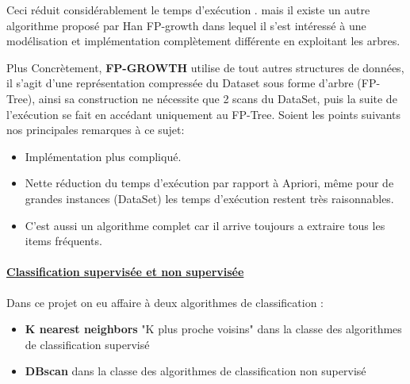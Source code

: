 \documentclass[12pt,a4paper,oneside]{book}
\begin{document}
Ceci réduit considérablement le temps d'exécution .
mais il existe un autre algorithme proposé par Han FP-growth dans lequel il s'est intéressé à une modélisation et implémentation complètement différente en exploitant les arbres.

Plus Concrètement, \textbf{FP-GROWTH} utilise de tout autres structures de données, il s'agit d'une représentation compressée du Dataset sous forme d'arbre (FP-Tree), ainsi sa construction ne nécessite que 2 scans du DataSet, puis la suite de l'exécution se fait en accédant uniquement au FP-Tree. Soient les points suivants nos principales remarques à ce sujet:
\begin{itemize}
	\item Implémentation plus compliqué.
	\item Nette réduction du temps d'exécution par rapport à Apriori, même pour de grandes instances (DataSet) les temps d'exécution restent très raisonnables.
	\item C'est aussi un algorithme complet car il arrive toujours a extraire tous les items fréquents. 
\end{itemize}


\paragraph{\underline{Classification supervisée et non supervisée}}

Dans ce projet on eu affaire à deux  algorithmes de classification :
\begin{itemize}
	\item \textbf{K nearest neighbors} "K plus proche voisins" dans la classe des algorithmes de classification supervisé
	\item \textbf{DBscan} dans la classe des algorithmes de classification non supervisé 
\end{itemize}
 
\end{document}
